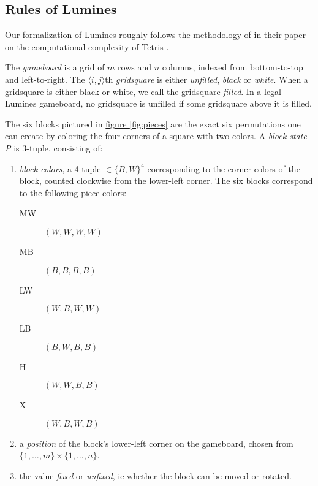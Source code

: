 \subsection{Rules of Lumines}
Our formalization of Lumines roughly follows the methodology of \citeauthor{tetris} in their paper on the computational complexity of Tetris \cite{tetris}.

\begin{description}[style=unboxed, leftmargin=0cm,labelsep=1em]
    \item[The gameboard] The \emph{gameboard} is a grid of $m$ rows and $n$ columns, indexed from bottom-to-top and left-to-right. The $\langle i,j \rangle$th \emph{gridsquare} is either \emph{unfilled}, \emph{black} or \emph{white}. When a gridsquare is either black or white, we call the gridsquare \emph{filled}. In a legal Lumines gameboard, no gridsquare is unfilled if some gridsquare above it is filled.

    \item[Game pieces] The six blocks pictured in \hyperref[fig:pieces]{figure \ref*{fig:pieces}} are the exact six permutations one can create by coloring the four corners of a square with two colors. A \emph{block state P} is 3-tuple, consisting of: 
    \begin{enumerate}
        \item \emph{block colors}, a 4-tuple $\in \{B,W\}^4$ corresponding to the corner colors of the block, counted clockwise from the lower-left corner. The six blocks correspond to the following piece colors:

        \begin{description}
            \item[MW] $(W,W,W,W)$
            \item[MB] $(B,B,B,B)$
            \item[LW] $(W,B,W,W)$
            \item[LB] $(B,W,B,B)$
            \item[H] $(W,W,B,B)$
            \item[X] $(W,B,W,B)$
        \end{description}

        \item a \emph{position} of the block's lower-left corner on the gameboard, chosen from $\{1, \ldots, m\} \times \{1, \ldots, n\}$.
        \item the value \emph{fixed} or \emph{unfixed}, ie whether the block can be moved or rotated.
    \end{enumerate}


\end{description}
